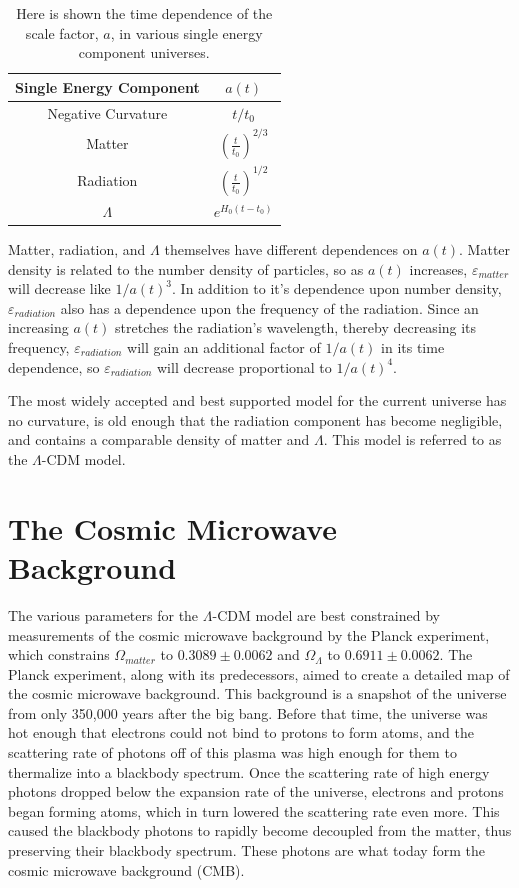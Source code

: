 \begin{table}[h!]
\begin{center}
  \begin{tabular}{ c | c  }
    Single Energy Component & $a(t)$ \\ \hline
    \hline
    Negative Curvature & $t/t_{0}$  \\ \hline
    Matter & $(\frac{t}{t_{0}})^{2/3}$  \\ \hline
    Radiation & $(\frac{t}{t_{0}})^{1/2}$  \\ \hline
    $\Lambda$ & $e^{H_{0}(t-t_{0})}$ \\
  \end{tabular}
\end{center}
\caption{Here is shown the time dependence of the scale factor, $a$, in various single energy component universes.}\label{table:energy components}
\end{table}

Matter, radiation, and $\Lambda$ themselves have different dependences on $a(t)$. Matter density is related to the number density of particles, so as $a(t)$ increases, $\varepsilon_{matter}$ will decrease like $1/a(t)^{3}$. In addition to it's dependence upon number density, $\varepsilon_{radiation}$ also has a dependence upon the frequency of the radiation. Since an increasing $a(t)$ stretches the radiation's wavelength, thereby decreasing its frequency, $\varepsilon_{radiation}$ will gain an additional factor of $1/a(t)$ in its time dependence, so $\varepsilon_{radiation}$ will decrease proportional to $1/a(t)^{4}$\cite{ryden}.

The most widely accepted and best supported model for the current universe has no curvature, is old enough that the radiation component has become negligible, and contains a comparable density of matter and $\Lambda$. This model is referred to as the $\Lambda$-CDM model. 

\section{The Cosmic Microwave Background}
The various parameters for the $\Lambda$-CDM model are best constrained by measurements of the cosmic microwave background by the Planck experiment, which constrains $\Omega_{matter}$ to $0.3089 \pm 0.0062$ and $\Omega_{\Lambda}$ to $0.6911 \pm 0.0062$\cite{planck2015}. The Planck experiment, along with its predecessors, aimed to create a detailed map of the cosmic microwave background. This background is a snapshot of the universe from only 350,000 years after the big bang.\cite{ryden} Before that time, the universe was hot enough that electrons could not bind to protons to form atoms, and the scattering rate of photons off of this plasma was high enough for them to thermalize into a blackbody spectrum. Once the scattering rate of high energy photons dropped below the expansion rate of the universe, electrons and protons began forming atoms, which in turn lowered the scattering rate even more. This caused the blackbody photons to rapidly become decoupled from the matter, thus preserving their blackbody spectrum. These photons are what today form the cosmic microwave background (CMB).


